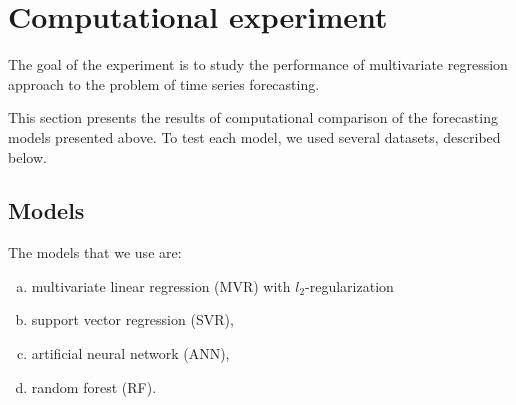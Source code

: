 \documentclass[conference]{IEEEtran}
\begin{document}
\section{Computational experiment}
The goal of the experiment is to study the performance of multivariate regression approach to the problem of
time series forecasting.

This section presents the results of computational comparison of the forecasting models presented above. To test each model, we used several datasets, described below.
\subsection{Models}
The models that we use are:
\begin{enumerate}[a)]
\item multivariate linear regression (MVR) with $l_2$-regularization
\item support vector regression (SVR),
\item artificial neural network (ANN),
\item random forest (RF).
\end{enumerate}
\end{document}
